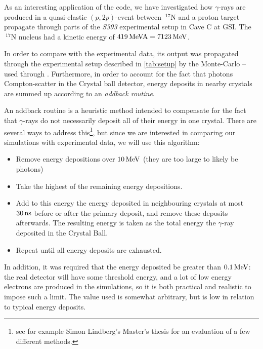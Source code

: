 As an interesting application of the code, we have investigated how $\gamma$-rays are produced in a quasi-elastic $(p,2p)$-event between $~^{17}\mathrm{N}$ and a proton target propagate through parts of the \emph{S393} experimental setup in Cave C at GSI. The $~^{17}\mathrm{N}$ nucleus had a kinetic energy of $\unit[419]{MeV A} = \unit[7123]{MeV}$.

In order to compare \codename{} with the experimental data, its output was propagated through the experimental setup described in \autoref{tab:setup} by the Monte-Carlo  -- used through .
Furthermore, in order to account for the fact that photons Compton-scatter in the Crystal ball detector, energy deposits in nearby crystals are summed up according to an \emph{addback routine}. 

An addback routine is a heuristic method intended to compensate for the fact that $\gamma$-rays do not necessarily deposit all of their energy in one crystal. There are several ways to address this\footnote{see for example Simon Lindberg's Master's thesis\cite{simon:2013:thesis} for an evaluation of a few different methods.}, but since we are interested in comparing our simulations with experimental data, we will use this algorithm:
\begin{itemize}
\item Remove energy depositions over $\unit[10]{MeV}$ (they are too large to likely be photons)
\item Take the highest of the remaining energy depositions.
\item Add to this energy the energy deposited in neighbouring crystals at most $\unit[30]{ns}$ before or after the primary deposit, and remove these deposits afterwards. The resulting energy is taken as the total energy the $\gamma$-ray deposited in the Crystal Ball.
\item Repeat until all energy deposits are exhausted.
\end{itemize}
In addition, it was required that the energy deposited be greater than $\unit[0.1]{MeV}$: the real detector will have some threshold energy, and a lot of low energy electrons are produced in the simulations, so it is both practical and realistic to impose such a limit. The value used is somewhat arbitrary, but is low in relation to typical energy deposits.

